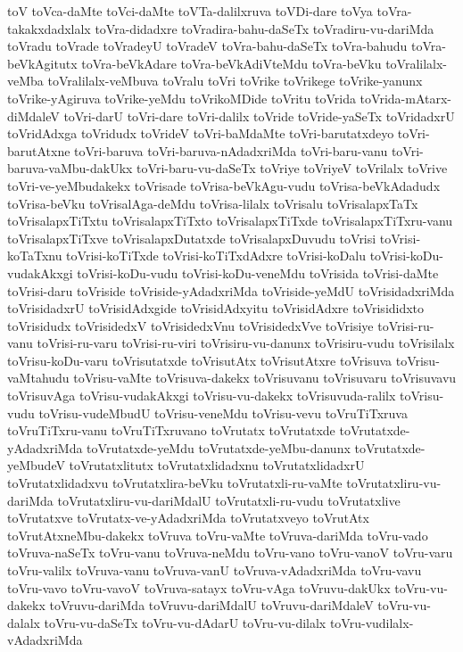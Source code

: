 {toV
toVca-daMte
toVci-daMte
toVTa-dalilxruva
toVDi-dare
toVya
toVra-takakxdadxlalx
toVra-didadxre
toVradira-bahu-daSeTx
toVradiru-vu-dariMda
toVradu
toVrade
toVradeyU
toVradeV
toVra-bahu-daSeTx
toVra-bahudu
toVra-beVkAgitutx
toVra-beVkAdare
toVra-beVkAdiVteMdu
toVra-beVku
toVralilalx-veMba
toVralilalx-veMbuva
toVralu
toVri
toVrike
toVrikege
toVrike-yanunx
toVrike-yAgiruva
toVrike-yeMdu
toVrikoMDide
toVritu
toVrida
toVrida-mAtarx-diMdaleV
toVri-darU
toVri-dare
toVri-dalilx
toVride
toVride-yaSeTx
toVridadxrU
toVridAdxga
toVridudx
toVrideV
toVri-baMdaMte
toVri-barutatxdeyo
toVri-barutAtxne
toVri-baruva
toVri-baruva-nAdadxriMda
toVri-baru-vanu
toVri-baruva-vaMbu-dakUkx
toVri-baru-vu-daSeTx
toVriye
toVriyeV
toVrilalx
toVrive
toVri-ve-yeMbudakekx
toVrisade
toVrisa-beVkAgu-vudu
toVrisa-beVkAdadudx
toVrisa-beVku
toVrisalAga-deMdu
toVrisa-lilalx
toVrisalu
toVrisalapxTaTx
toVrisalapxTiTxtu
toVrisalapxTiTxto
toVrisalapxTiTxde
toVrisalapxTiTxru-vanu
toVrisalapxTiTxve
toVrisalapxDutatxde
toVrisalapxDuvudu
toVrisi
toVrisi-koTaTxnu
toVrisi-koTiTxde
toVrisi-koTiTxdAdxre
toVrisi-koDalu
toVrisi-koDu-vudakAkxgi
toVrisi-koDu-vudu
toVrisi-koDu-veneMdu
toVrisida
toVrisi-daMte
toVrisi-daru
toVriside
toVriside-yAdadxriMda
toVriside-yeMdU
toVrisidadxriMda
toVrisidadxrU
toVrisidAdxgide
toVrisidAdxyitu
toVrisidAdxre
toVrisididxto
toVrisidudx
toVrisidedxV
toVrisidedxVnu
toVrisidedxVve
toVrisiye
toVrisi-ru-vanu
toVrisi-ru-varu
toVrisi-ru-viri
toVrisiru-vu-danunx
toVrisiru-vudu
toVrisilalx
toVrisu-koDu-varu
toVrisutatxde
toVrisutAtx
toVrisutAtxre
toVrisuva
toVrisu-vaMtahudu
toVrisu-vaMte
toVrisuva-dakekx
toVrisuvanu
toVrisuvaru
toVrisuvavu
toVrisuvAga
toVrisu-vudakAkxgi
toVrisu-vu-dakekx
toVrisuvuda-ralilx
toVrisu-vudu
toVrisu-vudeMbudU
toVrisu-veneMdu
toVrisu-vevu
toVruTiTxruva
toVruTiTxru-vanu
toVruTiTxruvano
toVrutatx
toVrutatxde
toVrutatxde-yAdadxriMda
toVrutatxde-yeMdu
toVrutatxde-yeMbu-danunx
toVrutatxde-yeMbudeV
toVrutatxlitutx
toVrutatxlidadxnu
toVrutatxlidadxrU
toVrutatxlidadxvu
toVrutatxlira-beVku
toVrutatxli-ru-vaMte
toVrutatxliru-vu-dariMda
toVrutatxliru-vu-dariMdalU
toVrutatxli-ru-vudu
toVrutatxlive
toVrutatxve
toVrutatx-ve-yAdadxriMda
toVrutatxveyo
toVrutAtx
toVrutAtxneMbu-dakekx
toVruva
toVru-vaMte
toVruva-dariMda
toVru-vado
toVruva-naSeTx
toVru-vanu
toVruva-neMdu
toVru-vano
toVru-vanoV
toVru-varu
toVru-valilx
toVruva-vanu
toVruva-vanU
toVruva-vAdadxriMda
toVru-vavu
toVru-vavo
toVru-vavoV
toVruva-satayx
toVru-vAga
toVruvu-dakUkx
toVru-vu-dakekx
toVruvu-dariMda
toVruvu-dariMdalU
toVruvu-dariMdaleV
toVru-vu-dalalx
toVru-vu-daSeTx
toVru-vu-dAdarU
toVru-vu-dilalx
toVru-vudilalx-vAdadxriMda
}
